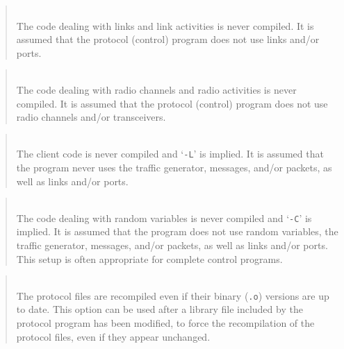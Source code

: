 \begin{quote}
\noindent{}\\ \hspace{0in}
The code dealing with links and link activities
is never compiled. It is assumed that the protocol (control) program
does not use links and/or ports.
\end{quote}

\begin{quote}
\noindent{}\\ \hspace{0in}
The code dealing with radio channels and radio activities
is never compiled. It is assumed that the protocol (control) program
does not use radio channels and/or transceivers.
\end{quote}

\begin{quote}
\noindent{}\\ \hspace{0in}
The client code is never compiled and `{\tt -L}' is implied.
It is assumed that the program never uses
the traffic generator, messages, and/or packets, as well as links and/or
ports.
\end{quote}

\begin{quote}
\noindent{}\\ \hspace{0in}
The code dealing with random variables is never compiled and
`{\tt -C}' is implied.
It is assumed that the program does not use random variables,
the traffic generator, messages, and/or packets, as well as links and/or
ports.
This setup is often appropriate for complete control programs.
\end{quote}

\begin{quote}
\noindent{}\\ \hspace{0in}
The protocol files are recompiled even if their binary ({\tt .o}) versions
are up to date.
This option can be used after a library file included by the protocol
program has been modified, to force the recompilation of the protocol
files, even if they appear unchanged.
\end{quote}

